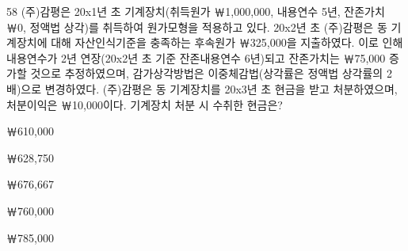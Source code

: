\begin{question}{58}
(주)감평은 20x1년 초 기계장치(취득원가 ￦1,000,000, 내용연수 5년, 잔존가치 ￦0, 정액법 상각)를 취득하여 원가모형을 적용하고 있다. 20x2년 초 (주)감평은 동 기계장치에 대해 자산인식기준을 충족하는 후속원가 ￦325,000을 지출하였다. 이로 인해 내용연수가 2년 연장(20x2년 초 기준 잔존내용연수 6년)되고 잔존가치는 ￦75,000 증가할 것으로 추정하였으며, 감가상각방법은 이중체감법(상각률은 정액법 상각률의 2배)으로 변경하였다. (주)감평은 동 기계장치를 20x3년 초 현금을 받고 처분하였으며, 처분이익은 ￦10,000이다. 기계장치 처분 시 수취한 현금은?
\begin{choices}
  \item ￦610,000
  \item ￦628,750
  \item ￦676,667
  \item ￦760,000
  \item ￦785,000
\end{choices}
\end{question}
